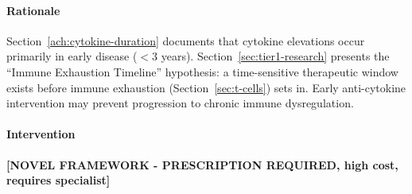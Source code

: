 \paragraph{Rationale}
Section~\ref{ach:cytokine-duration} documents that cytokine elevations occur primarily in early disease ($<$3 years). Section~\ref{sec:tier1-research} presents the ``Immune Exhaustion Timeline'' hypothesis: a time-sensitive therapeutic window exists before immune exhaustion (Section~\ref{sec:t-cells}) sets in. Early anti-cytokine intervention may prevent progression to chronic immune dysregulation.

\paragraph{Intervention}

\textbf{[NOVEL FRAMEWORK - PRESCRIPTION REQUIRED, high cost, requires specialist]}

